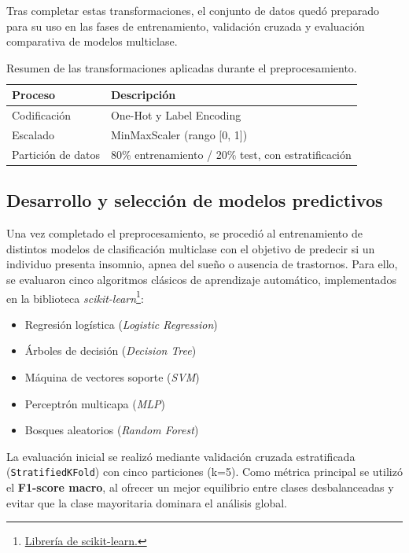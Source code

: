 Tras completar estas transformaciones, el conjunto de datos quedó preparado para su uso en las fases de entrenamiento, validación cruzada y evaluación comparativa de modelos multiclase.


\begin{table}[H]
\centering
\begin{tabular}{ll}
\toprule
\textbf{Proceso} & \textbf{Descripción} \\
\midrule
Codificación      & One-Hot y Label Encoding \\
Escalado          & MinMaxScaler (rango [0, 1]) \\
Partición de datos & 80\% entrenamiento / 20\% test, con estratificación \\
\bottomrule
\end{tabular}
\caption{Resumen de las transformaciones aplicadas durante el preprocesamiento.}
\end{table}


\subsection{Desarrollo y selección de modelos predictivos}

Una vez completado el preprocesamiento, se procedió al entrenamiento de distintos modelos de clasificación multiclase con el objetivo de predecir si un individuo presenta insomnio, apnea del sueño o ausencia de trastornos. Para ello, se evaluaron cinco algoritmos clásicos de aprendizaje automático, implementados en la biblioteca \textit{scikit-learn}\footnote{\href{https://scikit-learn.org/}{Librería de scikit-learn.}}:

\begin{itemize}
    \item Regresión logística (\textit{Logistic Regression})
    \item Árboles de decisión (\textit{Decision Tree})
    \item Máquina de vectores soporte (\textit{SVM})
    \item Perceptrón multicapa (\textit{MLP})
    \item Bosques aleatorios (\textit{Random Forest})
\end{itemize}

La evaluación inicial se realizó mediante validación cruzada estratificada (\texttt{StratifiedKFold}) con cinco particiones (k=5). Como métrica principal se utilizó el \textbf{F1-score macro}, al ofrecer un mejor equilibrio entre clases desbalanceadas y evitar que la clase mayoritaria dominara el análisis global.

